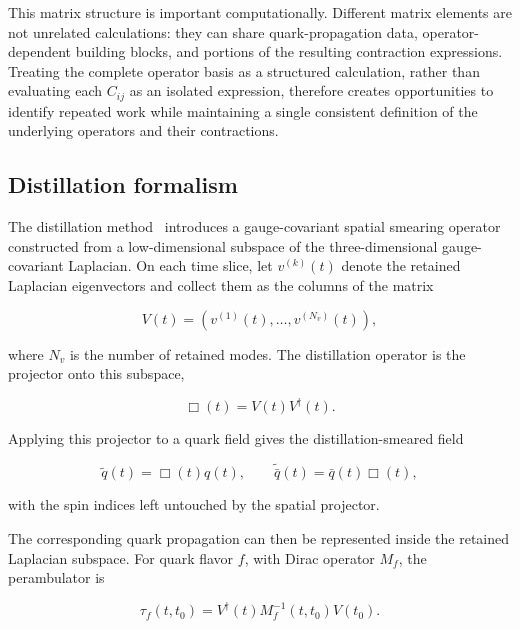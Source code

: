 \documentclass[11pt]{article}
\begin{document}
This matrix structure is important computationally. Different matrix elements
are not unrelated calculations: they can share quark-propagation data,
operator-dependent building blocks, and portions of the resulting contraction
expressions. Treating the complete operator basis as a structured calculation,
rather than evaluating each \(C_{ij}\) as an isolated expression, therefore
creates opportunities to identify repeated work while maintaining a single
consistent definition of the underlying operators and their contractions.

\subsection{Distillation formalism}

The distillation method~\cite{Peardon:2009gh} introduces a gauge-covariant
spatial smearing operator constructed from a low-dimensional subspace of the
three-dimensional gauge-covariant Laplacian. On each time slice, let
\(v^{(k)}(t)\) denote the retained Laplacian eigenvectors and collect them as the
columns of the matrix

\begin{equation}
V(t)
=
\left(
 v^{(1)}(t),\ldots,v^{(N_v)}(t)
\right),
\end{equation}

where \(N_v\) is the number of retained modes. The distillation operator is the
projector onto this subspace,

\begin{equation}
\Box(t)=V(t)V^\dagger(t).
\label{eq:distillation_projector}
\end{equation}

Applying this projector to a quark field gives the distillation-smeared field

\begin{equation}
\widetilde q(t)=\Box(t)q(t),
\qquad
\widetilde{\bar q}(t)=\bar q(t)\Box(t),
\end{equation}

with the spin indices left untouched by the spatial projector.

The corresponding quark propagation can then be represented inside the
retained Laplacian subspace. For quark flavor \(f\), with Dirac operator
\(M_f\), the perambulator is

\begin{equation}
\tau_f(t,t_0)
=
V^\dagger(t) M_f^{-1}(t,t_0) V(t_0).
\label{eq:perambulator}
\end{equation}
\end{document}
